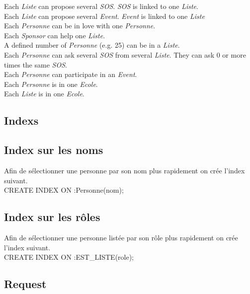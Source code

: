 \documentclass[a4paper,oneside,1pt]{article}
\begin{document}
Each \textit{Liste} can propose several \textit{SOS}. \textit{SOS} is linked to one \textit{Liste}. \\
Each \textit{Liste} can propose several \textit{Event}. \textit{Event} is linked to one \textit{Liste} \\
Each \textit{Personne} can be in love with one \textit{Personne}. \\
Each \textit{Sponsor} can help one \textit{Liste}. \\
A defined number of \textit{Personne} (e.g. 25) can be in a \textit{Liste}. \\
Each \textit{Personne} can ask several \textit{SOS} from several \textit{Liste}. They can ask 0 or more times the same \textit{SOS}. \\
Each \textit{Personne} can participate in an \textit{Event}. \\
Each \textit{Personne} is in one \textit{Ecole}. \\
Each \textit{Liste} is in one \textit{Ecole}. \\
\subsection{Indexs}
\subsection{Index sur les noms}
Afin de sélectionner une personne par son nom plus rapidement on crée l'index suivant.
\\
CREATE INDEX ON :Personne(nom);
\subsection{Index sur les rôles}
Afin de sélectionner une personne listée par son rôle plus rapidement on crée l'index suivant.
\\
CREATE INDEX ON :EST\_LISTE(role);
\subsection{Request}

\end{document}
